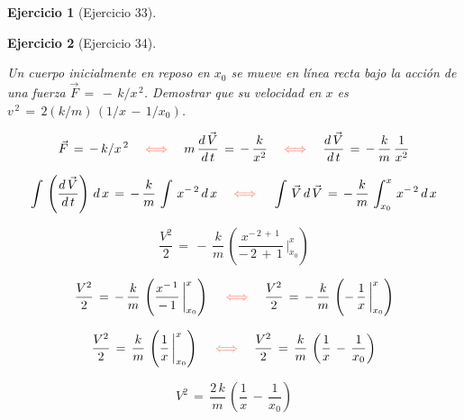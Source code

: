 \documentclass[a4paper,11pt]{book}
\newtheorem{ejer}{Ejercicio}[section]
\begin{document}
  

\begin{ejer}[Ejercicio 33] 

  

\end{ejer} 

  

\begin{ejer}[Ejercicio 34] 

\
 
Un cuerpo inicialmente en reposo en $x_{0}$ se mueve en línea recta bajo la acción de una fuerza $\vec{F}\,=\,-\,k/x^{\,2}$. Demostrar que su velocidad en $x$ es $v^{\,2}\,=\,2(k/m)\,(1/x\,-\,1/x_{0})$.
 
 
$$\vec{F}\,=\,-\,k/x^{\,2} \quad \textcolor{bittersweet}{\iff} \quad m\,\dfrac{d\,\vec{V}}{d\,t}\,=\,-\,\dfrac{k}{x^{2}} \quad \textcolor{bittersweet}{\iff} \quad \dfrac{d\,\vec{V}}{d\,t}\,=\,-\,\dfrac{k}{m}\,\dfrac{1}{x^{2}}$$
 
$$\int\,\left(\dfrac{d\,\vec{V}}{d\,t} \right)\,d\,x\,=\,-\,\dfrac{k}{m}\,\int\,x^{-\,2}\,d\,x \quad \textcolor{bittersweet}{\iff} \quad \int\,\vec{V}\,d\,\vec{V}\,=\,-\,\dfrac{k}{m}\,\int_{x_{0}}^{x}\,x^{-\,2}\,d\,x$$
 
$$\dfrac{V^{2}}{2}\,=\,-\,\dfrac{k}{m}\,\left(\dfrac{x^{-\,2\,+\,1} }{-\,2\,+\,1}\,\biggr|_{x_{0}}^{x} \right)$$
 
$$\dfrac{V^{2}}{2}\,=\,-\,\dfrac{k}{m}\,\left(\dfrac{x^{-\,1 } }{-\,1 }\,\biggr|_{x_{0}}^{x} \right) \quad \textcolor{bittersweet}{\iff} \quad \dfrac{V^{2}}{2}\,=\,-\,\dfrac{k}{m}\,\left(-\,\dfrac{1}{x }\,\biggr|_{x_{0}}^{x} \right)$$
 
$$\dfrac{V^{2}}{2}\,=\,\dfrac{k}{m}\,\left(\dfrac{1}{x }\,\biggr|_{x_{0}}^{x} \right) \quad \textcolor{bittersweet}{\iff} \quad \dfrac{V^{2}}{2}\,=\,\dfrac{k}{m}\,\left(\dfrac{1}{x}\,-\,\dfrac{1}{x_{0}} \right)$$
 
$$\boxed{V^{2}\,=\,\dfrac{2\,k}{m}\,\left(\dfrac{1}{x}\,-\,\dfrac{1}{x_{0}} \right) }$$
 
\end{ejer} 

  
\end{document}
